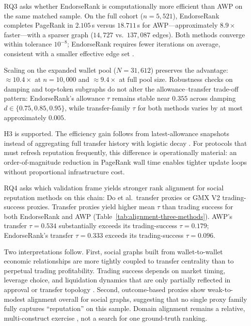 
RQ3 asks whether EndorseRank is computationally more efficient than AWP on the same matched sample. On the full cohort ($n=5{,}521$), EndorseRank completes PageRank in $2.105$\,s versus $18.711$\,s for AWP---approximately $8.9\times$ faster---with a sparser graph ($14{,}727$ vs.\ $137{,}087$ edges). Both methods converge within tolerance $10^{-8}$; EndorseRank requires fewer iterations on average, consistent with a smaller effective edge set .

Scaling on the expanded wallet pool ($N=31{,}612$) preserves the advantage: $\approx 10.4\times$ at $n=10{,}000$ and $\approx 9.4\times$ at full pool size. Robustness checks on damping and top-token subgraphs do not alter the allowance--transfer trade-off pattern: EndorseRank's allowance $\tau$ remains stable near $0.355$ across damping $d \in \{0.75, 0.85, 0.95\}$, while transfer-family $\tau$ for both methods varies by at most approximately $0.005$.

H3 is supported. The efficiency gain follows from latest-allowance snapshots instead of aggregating full transfer history with logistic decay . For protocols that must refresh reputation frequently, this difference is operationally material: an order-of-magnitude reduction in PageRank wall time enables tighter update loops without proportional infrastructure cost.


RQ4 asks which validation frame yields stronger rank alignment for social reputation methods on this chain: Do et al.\ transfer proxies or GMX V2 trading-success proxies. Transfer proxies yield higher mean $\tau$ than trading success for both EndorseRank and AWP (Table~\ref{tab:alignment-three-methods}). AWP's transfer $\tau=0.534$ substantially exceeds its trading-success $\tau=0.179$; EndorseRank's transfer $\tau=0.333$ exceeds its trading-success $\tau=0.096$.

Two interpretations follow. First, social graphs built from wallet-to-wallet economic relationships are more tightly coupled to transfer centrality than to perpetual trading profitability. Trading success depends on market timing, leverage choice, and liquidation dynamics that are only partially reflected in approval or transfer topology . Second, outcome-based proxies show weak-to-modest alignment overall for social graphs, suggesting that no single proxy family fully captures ``reputation'' on this sample. Domain alignment remains a relative, multi-construct exercise , not a search for one ground-truth ranking.

